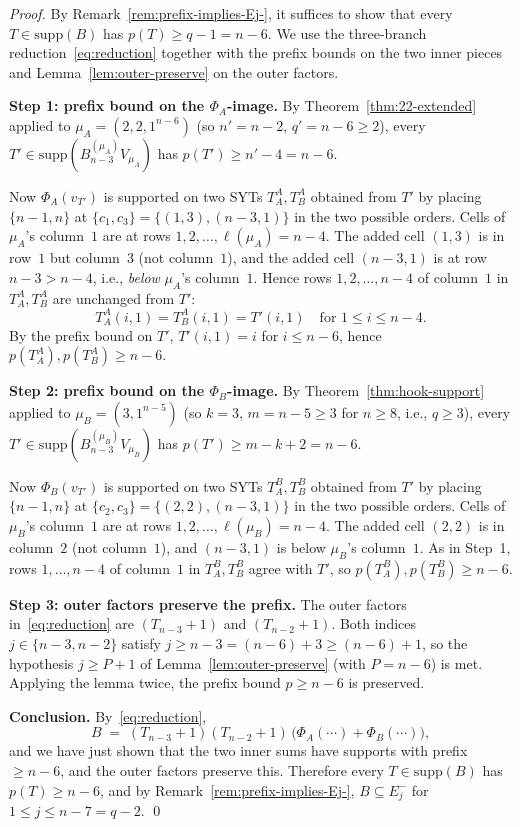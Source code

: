 \documentclass[11pt]{article}
\theoremstyle{definition}
\newcommand{\supp}{\mathrm{supp}}
\begin{document}
\begin{proof}
By Remark~\ref{rem:prefix-implies-Ej-}, it suffices to show that
every $T \in \supp(B)$ has $p(T) \ge q - 1 = n - 6$.  We use the
three-branch reduction~\eqref{eq:reduction} together with the
prefix bounds on the two inner pieces and Lemma~\ref{lem:outer-preserve}
on the outer factors.

\medskip\textbf{Step 1: prefix bound on the $\Phi_A$-image.}
By Theorem~\ref{thm:22-extended} applied to $\mu_A = (2, 2, 1^{n-6})$
(so $n' = n - 2$, $q' = n - 6 \ge 2$), every $T' \in
\supp(B^{(\mu_A)}_{n-3} V_{\mu_A})$ has $p(T') \ge n' - 4 = n - 6$.

Now $\Phi_A(v_{T'})$ is supported on two SYTs $T_A^A, T_B^A$ obtained
from $T'$ by placing $\{n - 1, n\}$ at $\{c_1, c_3\} = \{(1, 3),
(n - 3, 1)\}$ in the two possible orders.  Cells of $\mu_A$'s
column~$1$ are at rows $1, 2, \ldots, \ell(\mu_A) = n - 4$.  The
added cell $(1, 3)$ is in row~$1$ but column~$3$ (not column~$1$),
and the added cell $(n - 3, 1)$ is at row $n - 3 > n - 4$, i.e.,
\emph{below} $\mu_A$'s column~$1$.  Hence rows $1, 2, \ldots, n - 4$
of column~$1$ in $T_A^A, T_B^A$ are unchanged from $T'$:
\[
   T_A^A(i, 1) = T_B^A(i, 1) = T'(i, 1) \quad\text{for } 1 \le i \le n - 4.
\]
By the prefix bound on $T'$, $T'(i, 1) = i$ for $i \le n - 6$, hence
$p(T_A^A), p(T_B^A) \ge n - 6$.

\medskip\textbf{Step 2: prefix bound on the $\Phi_B$-image.}
By Theorem~\ref{thm:hook-support} applied to $\mu_B = (3, 1^{n-5})$
(so $k = 3$, $m = n - 5 \ge 3$ for $n \ge 8$, i.e., $q \ge 3$), every
$T' \in \supp(B^{(\mu_B)}_{n-3} V_{\mu_B})$ has
$p(T') \ge m - k + 2 = n - 6$.

Now $\Phi_B(v_{T'})$ is supported on two SYTs $T_A^B, T_B^B$ obtained
from $T'$ by placing $\{n - 1, n\}$ at $\{c_2, c_3\} = \{(2, 2),
(n - 3, 1)\}$ in the two possible orders.  Cells of $\mu_B$'s
column~$1$ are at rows $1, 2, \ldots, \ell(\mu_B) = n - 4$.  The
added cell $(2, 2)$ is in column~$2$ (not column~$1$), and $(n - 3, 1)$
is below $\mu_B$'s column~$1$.  As in Step~1, rows $1, \ldots, n - 4$
of column~$1$ in $T_A^B, T_B^B$ agree with $T'$, so
$p(T_A^B), p(T_B^B) \ge n - 6$.

\medskip\textbf{Step 3: outer factors preserve the prefix.}
The outer factors in~\eqref{eq:reduction} are $(T_{n-3} + 1)$ and
$(T_{n-2} + 1)$.  Both indices $j \in \{n - 3, n - 2\}$ satisfy
$j \ge n - 3 = (n - 6) + 3 \ge (n - 6) + 1$, so the hypothesis
$j \ge P + 1$ of Lemma~\ref{lem:outer-preserve} (with $P = n - 6$)
is met.  Applying the lemma twice, the prefix bound $p \ge n - 6$ is
preserved.

\medskip\textbf{Conclusion.}  By~\eqref{eq:reduction},
\[
   B \;=\; (T_{n-3}+1)(T_{n-2}+1)\,\bigl(\Phi_A(\cdots) + \Phi_B(\cdots)\bigr),
\]
and we have just shown that the two inner sums have supports with
prefix $\ge n - 6$, and the outer factors preserve this.  Therefore
every $T \in \supp(B)$ has $p(T) \ge n - 6$, and by
Remark~\ref{rem:prefix-implies-Ej-},
$B \subseteq E_j^-$ for $1 \le j \le n - 7 = q - 2$.
\qed
\end{proof}
\end{document}
